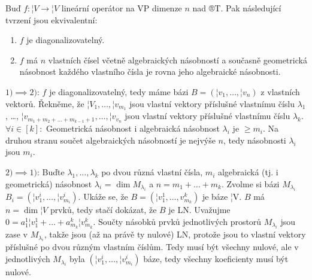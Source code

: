 \documentclass[12pt]{article}                   %
\begin{document}
        \begin{veta}
            Buď $f: ¦V \rightarrow ¦V$ lineární operátor na VP dimenze $n$ nad ®T. Pak následující tvrzení jsou ekvivalentní:

            \begin{enumerate}
                \item $f$ je diagonalizovatelný.
                \item $f$ má $n$ vlastních čísel včetně algebraických násobností a současně geometrická násobnost každého vlastního čísla je rovna jeho algebraické násobnosti.
            \end{enumerate}
            
            \begin{dukazin}
                $1) \implies 2)$: $f$ je diagonalizovatelný, tedy máme bázi $B = (¦v_1, …, ¦v_n)$ z vlastních vektorů. Řekněme, že $¦V_1, …, ¦v_{m_1}$ jsou vlastní vektory příslušné vlastnímu číslu $\lambda_1$, …, $¦v_{m_1 + m_2 + … + m_{k-1} + 1}, …, ¦v_{v_n}$ jsou vlastní vektory příslušné vlastnímu číslu $\lambda_k$. $\forall i \in [k]:$ Geometrická násobnost i algebraická násobnost $\lambda_i$ je $≥ m_i$. Na druhou stranu součet algebraických násobností je nejvýše $n$, tedy násobnosti $\lambda_i$ jsou $m_i$.

                $2) \implies 1)$: Buďte $\lambda_1, …, \lambda_k$ po dvou různá vlastní čísla, $m_i$ algebraická (tj. i geometrická) násobnost $\lambda_i$ = $\dim M_{\lambda_i}$ a $n = m_1 + … + m_k$. Zvolme si bázi $M_{\lambda_i}$ $B_i = (¦v_1^i, …, ¦v_{m_i}^i)$. Ukáže se, že $B = (¦v_1^1, …, v_{m_k}^k)$ je báze ¦V. $B$ má $n = \dim ¦V$ prvků, tedy stačí dokázat, že $B$ je LN. Uvažujme $0 = a_1^1¦v_1^1 + … + a_{m_k}^k¦v_{m_k}^k$. Součty násobků prvků jednotlivých prostorů $M_{\lambda_i}$ jsou zase v $M_{\lambda_i}$, takže jsou (až na právě ty nulové) LN, protože jsou to vlastní vektory příslušné po dvou různým vlastním číslům. Tedy musí být všechny nulové, ale v jednotlivých $M_{\lambda_i}$ byla $(¦v_1^i, …, ¦v_{m_i}^i)$ báze, tedy všechny koeficienty musí být nulové. 
            \end{dukazin}
        \end{veta}
\end{document}
